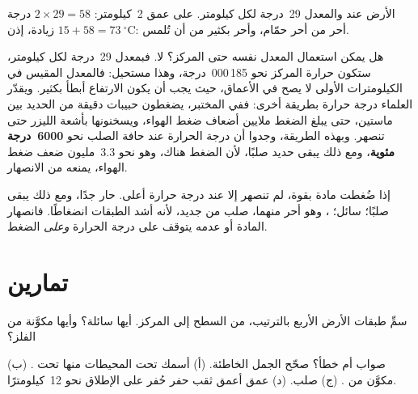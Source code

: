 \begin{example}\label{ex:g6:inside-the-earth:two-km}
الأرض عند  والمعدل 29~درجة لكل كيلومتر.
على عمق 2~كيلومتر: $2 \times 29 = 58$ درجة زيادة، إذن $15 + 58 = 73~^\circ$C:
أحر من أحر حمّام، وأحر بكثير من أن تُلمس.
\end{example}

هل يمكن استعمال المعدل نفسه حتى المركز؟ لا. فبمعدل 29~درجة لكل
كيلومتر، ستكون حرارة المركز نحو 185\,000~درجة، وهذا
مستحيل: فالمعدل المقيس في الكيلومترات الأولى لا يصح في الأعماق، حيث يجب أن يكون الارتفاع أبطأ بكثير. ويقدّر العلماء درجة حرارة
 بطريقة أخرى: ففي المختبر، يضغطون حبيبات دقيقة من
الحديد بين ماستين، حتى يبلغ الضغط ملايين أضعاف ضغط الهواء،
ويسخنونها بأشعة الليزر حتى تنصهر. وبهذه الطريقة، وجدوا أن
درجة الحرارة عند حافة  الصلب نحو
\textbf{6000~درجة مئوية}، ومع ذلك يبقى حديد  صلبًا، لأن الضغط هناك، وهو نحو
3.3~مليون ضعف ضغط الهواء، يمنعه من الانصهار.

\begin{remark}\label{rem:g6:inside-the-earth:pressure}
إذا ضُغطت مادة بقوة، لم تنصهر إلا عند درجة حرارة أعلى. 
حار جدًا، ومع ذلك يبقى صلبًا؛  سائل؛ ،
وهو أحر منهما، صلب من جديد، لأنه أشد الطبقات انضغاطًا.
فانصهار المادة أو عدمه يتوقف على درجة الحرارة \emph{وعلى} الضغط.
\end{remark}

\section{تمارين}

\begin{exercise}[$\star$]\label{exo:g6:inside-the-earth:1}
سمِّ طبقات الأرض الأربع بالترتيب، من السطح إلى
المركز. أيها سائلة؟ وأيها مكوَّنة من الفلز؟
\end{exercise}

\begin{exercise}[$\star$]\label{exo:g6:inside-the-earth:2}
صواب أم خطأ؟ صحّح الجمل الخاطئة.
(أ)  أسمك تحت المحيطات منها تحت .
(ب)  مكوَّن من .
(ج)  صلب.
(د) عمق أعمق ثقب حفر حُفر على الإطلاق نحو 12~كيلومترًا.
\end{exercise}

